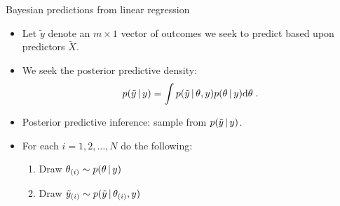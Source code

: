 \begin{frame}{Bayesian predictions from linear regression}
 
 \begin{itemize}\setlength{\itemsep}{0.4cm}
  \item Let $\tilde{y}$ denote an $m\times 1$ vector of outcomes we seek to predict based upon predictors $\tilde{X}$.
  \item We seek the posterior predictive density:
\[
 p(\tilde{y}\,|\, y) = \int p(\tilde{y}\,|\, \theta, y) p(\theta\,|\, y) \mbox{d}\theta\; .
\]
  \item Posterior predictive inference: sample from $p(\tilde{y}\,|\, y)$.
  \item For each $i=1,2,\ldots,N$ do the following: 
 \begin{enumerate}\setlength{\itemsep}{0.25cm}
  \item Draw $\displaystyle \theta_{(i)} \sim p(\theta\,|\, y)$
  \item Draw $\displaystyle \tilde{y}_{(i)} \sim p(\tilde{y}\,|\, \theta_{(i)},y)$
 \end{enumerate}
  
 \end{itemize}

\end{frame}

